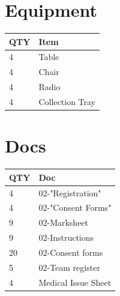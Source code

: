 \documentclass[10pt]{article}
\begin{document}
	\begin{multicols}{2}

		\section*{\faWrench \: Equipment}

		
	\begin{center}
			\begin{tabular}{p{2cm}p{4cm}}


				\textbf{QTY} & \textbf{Item} \\\toprule
												4&Table\\\midrule
												4&Chair\\\midrule
												4&Radio\\\midrule
												4&Collection Tray\\\midrule
								\end{tabular}

			\end{center}

		
		\vfill\null
		\columnbreak

			\section*{\faFile \: Docs}
		 	\begin{center}
			\begin{tabular}{p{2cm}p{4cm}}

			\textbf{QTY} & \textbf{Doc} \\\toprule
										4&02-"Registration"\\\midrule
										4&02-"Consent Forms"\\\midrule
										9&02-Marksheet\\\midrule
										9&02-Instructions\\\midrule
										20&02-Consent forms\\\midrule
										5&02-Team register\\\midrule
										4&Medical Issue Sheet\\\midrule
							\end{tabular}
			\end{center}
	

		\vfill\null

		\end{multicols}



	\vspace{1cm}
\end{document}
